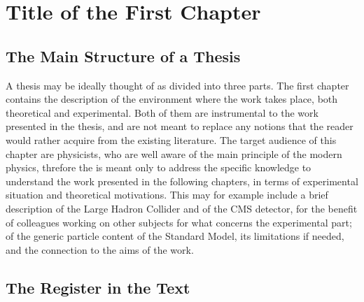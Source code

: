 \chapter{Title of the First Chapter}



\section{The Main Structure of a Thesis}

A thesis may be ideally thought of as divided into three parts.
The first chapter contains the description of the environment where the work takes place,
both theoretical and experimental.
Both of them are instrumental to the work presented in the thesis, 
and are not meant to replace any notions that the reader would rather acquire 
from the existing literature.
The target audience of this chapter are physicists,
who are well aware of the main principle of the modern physics,
threfore the is meant only to address the specific knowledge to understand the work presented
in the following chapters,
in terms of experimental situation and theoretical motivations.
This may for example include a brief description of the Large Hadron Collider
and of the CMS detector, for the benefit of colleagues working on other subjects
for what concerns the experimental part; 
of the generic particle content of the Standard Model,
its limitations if needed,
and the connection to the aims of the work.


\section{The Register in the Text}

